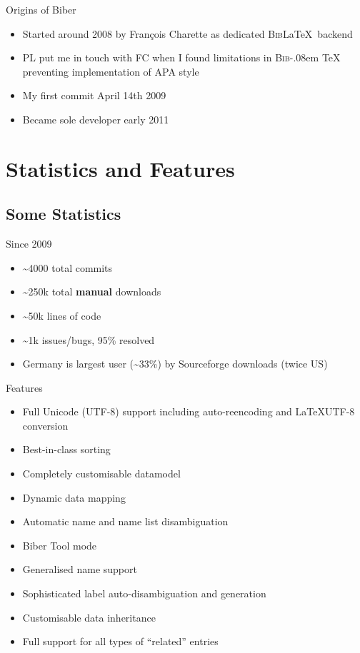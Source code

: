 \documentclass[xcolor=dvipsnames]{beamer}
\def\BibLaTeX{\textsc{Bib}\LaTeX}
\def\BibTeX{\textsc{Bib}\kern-.08em \TeX}
\begin{document}
\begin{frame}{Origins of Biber}{}
  \begin{itemize}
  \item Started around 2008 by François Charette as dedicated \BibLaTeX\ backend
  \item PL put me in touch with FC when I found limitations in \BibTeX
    preventing implementation of APA style
  \item My first commit April 14th 2009
  \item Became sole developer early 2011
  \end{itemize}
\end{frame}

\section*{Statistics and Features}

\subsection*{Some Statistics}

\begin{frame}{Since 2009}
  \begin{itemize}
  \item \textasciitilde 4000 total commits
  \item \textasciitilde 250k total \textbf{manual} downloads
  \item \textasciitilde 50k lines of code
  \item \textasciitilde 1k issues/bugs, 95\% resolved
  \item Germany is largest user (\textasciitilde 33\%) by Sourceforge downloads (twice US)
  \end{itemize}
\end{frame}

\begin{frame}{Features}
  \begin{itemize}
  \item Full Unicode (UTF-8) support including auto-reencoding and
    \LaTeX\leftrightarrow UTF-8 conversion
  \item Best-in-class sorting
  \item Completely customisable datamodel
  \item Dynamic data mapping
  \item Automatic name and name list disambiguation
  \item Biber Tool mode
  \item Generalised name support
  \item Sophisticated label auto-disambiguation and generation
  \item Customisable data inheritance
  \item Full support for all types of ``related'' entries
  \end{itemize}
\end{frame}
\end{document}

